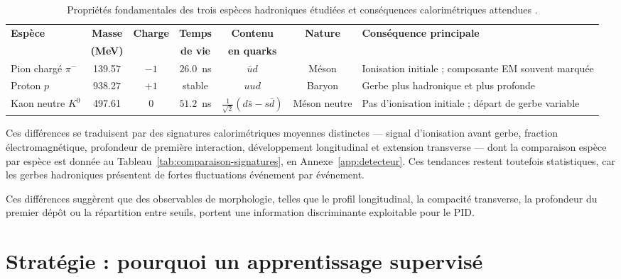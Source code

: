 \begin{table}[!ht]
    \centering
    \caption{Propriétés fondamentales des trois espèces hadroniques étudiées et conséquences
             calorimétriques attendues \cite{pdg2024}.}
    \label{tab:hadrons}
    \footnotesize
    \renewcommand{\arraystretch}{1.3}
    \begin{tabularx}{\textwidth}{@{}p{2.35cm} c c c c c >{\raggedright\arraybackslash}X@{}}
        \hline
        \textbf{Espèce} & \textbf{Masse} & \textbf{Charge} & \textbf{Temps} &
        \textbf{Contenu} & \textbf{Nature} & \textbf{Conséquence principale} \\
         & \textbf{(MeV)} & & \textbf{de vie} & \textbf{en quarks} & & \\
        \hline
        Pion chargé $\pi^-$
            & 139.57 & $-1$ & $26.0$~ns & $\bar{u}d$ & Méson
            & Ionisation initiale ; composante EM souvent marquée \\
        Proton $p$
            & 938.27 & $+1$ & stable & $uud$ & Baryon
            & Gerbe plus hadronique et plus profonde \\
        Kaon neutre $K^0$
            & 497.61 & $0$ & $51.2$~ns
            & $\frac{1}{\sqrt{2}}(d\bar{s}-s\bar{d})$ & Méson neutre
            & Pas d'ionisation initiale ; départ de gerbe variable \\
        \hline
    \end{tabularx}
\end{table}

Ces différences se traduisent par des signatures calorimétriques moyennes distinctes — signal d'ionisation avant gerbe, fraction électromagnétique, profondeur de première interaction, développement longitudinal et extension transverse — dont la comparaison espèce par espèce est donnée au Tableau~\ref{tab:comparaison-signatures}, en Annexe~\ref{app:detecteur}. Ces tendances restent toutefois statistiques, car les gerbes hadroniques présentent de fortes fluctuations événement par événement.

Ces différences suggèrent que des observables de morphologie, telles que le profil longitudinal, la compacité transverse, la profondeur du premier dépôt ou la répartition entre seuils, portent une information discriminante exploitable pour le PID.

\section{Stratégie : pourquoi un apprentissage supervisé}
\label{sec:pid-strategie}

